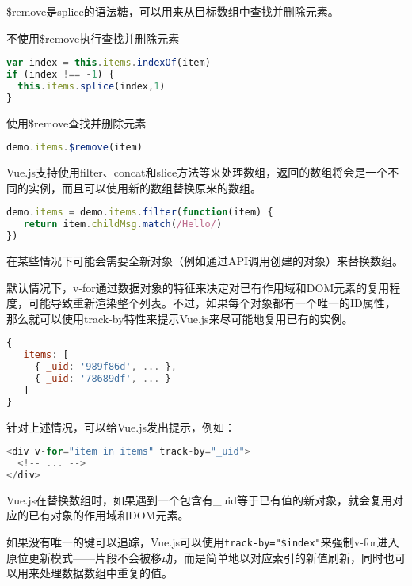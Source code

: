 \$remove是splice的语法糖，可以用来从目标数组中查找并删除元素。

\begin{compactitem}
\item 不使用\$remove执行查找并删除元素

\begin{lstlisting}[language=JavaScript]
var index = this.items.indexOf(item)
if (index !== -1) {
  this.items.splice(index,1)
}
\end{lstlisting}

\item 使用\$remove查找并删除元素

\begin{lstlisting}[language=JavaScript]
demo.items.$remove(item)
\end{lstlisting}

\end{compactitem}


Vue.js支持使用filter、concat和slice方法等来处理数组，返回的数组将会是一个不同的实例，而且可以使用新的数组替换原来的数组。


\begin{lstlisting}[language=JavaScript]
demo.items = demo.items.filter(function(item) {
   return item.childMsg.match(/Hello/)
})
\end{lstlisting}


在某些情况下可能会需要全新对象（例如通过API调用创建的对象）来替换数组。

默认情况下，v-for通过数据对象的特征来决定对已有作用域和DOM元素的复用程度，可能导致重新渲染整个列表。不过，如果每个对象都有一个唯一的ID属性，那么就可以使用track-by特性来提示Vue.js来尽可能地复用已有的实例。

\begin{lstlisting}[language=JavaScript]
{
   items: [
     { _uid: '989f86d', ... },
     { _uid: '78689df', ... }
   ]
}
\end{lstlisting}

针对上述情况，可以给Vue.js发出提示，例如：

\begin{lstlisting}[language=JavaScript]
<div v-for="item in items" track-by="_uid">
  <!-- ... -->
</div>
\end{lstlisting}

Vue.js在替换数组时，如果遇到一个包含有\_uid等于已有值的新对象，就会复用对应的已有对象的作用域和DOM元素。

如果没有唯一的键可以追踪，Vue.js可以使用\texttt{track-by="\$index"}来强制v-for进入原位更新模式——片段不会被移动，而是简单地以对应索引的新值刷新，同时也可以用来处理数据数组中重复的值。


